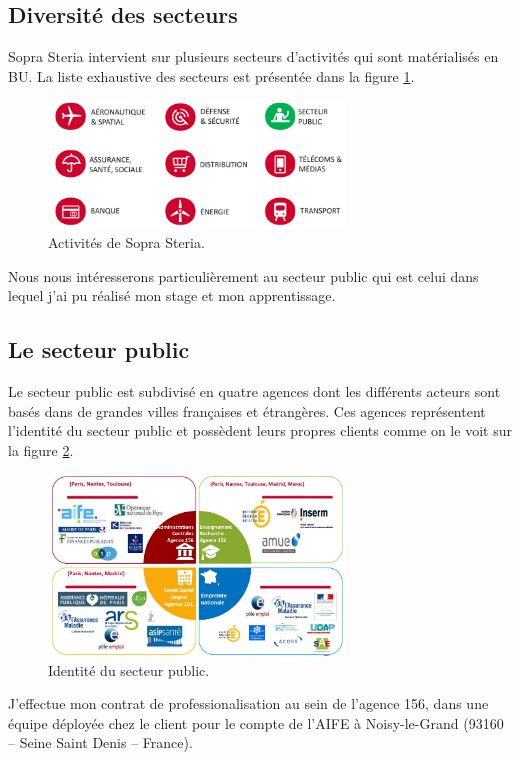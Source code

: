 \documentclass[12pt,a4paper]{article}
\begin{document}
\subsection{Diversité des secteurs}
Sopra Steria intervient sur plusieurs secteurs d’activités qui sont matérialisés en \gls{BU}. La liste exhaustive des secteurs est présentée dans la figure \ref{secteurs}.
\smallbreak
\begin{figure}[H]
	\begin{center}		\includegraphics[width=0.7\textwidth,keepaspectratio]{secteursActivites.png}
		\caption{Activités de Sopra Steria.}
		\label{secteurs}
	\end{center}
\end{figure}
Nous nous intéresserons particulièrement au secteur public qui est celui dans lequel j'ai pu réalisé mon stage et mon apprentissage.
\subsection{Le secteur public}
Le secteur public est subdivisé en quatre agences dont les différents acteurs sont basés dans de grandes villes françaises et étrangères. Ces agences représentent l'identité du secteur public et possèdent leurs propres clients comme on le voit sur la figure \ref{agences}.
\begin{figure}[H]
	\begin{center}
		\includegraphics[width=0.7\textwidth,keepaspectratio]{identiteSecteurPublic.png}
		\caption{Identité du secteur public.}
		\label{agences}
	\end{center}
\end{figure}
J’effectue mon contrat de professionalisation au sein de l'agence 156, dans une équipe déployée chez le client pour le compte de l’AIFE à Noisy-le-Grand (93160 – Seine Saint Denis – France).
\newpage
\clearpage
\end{document}

